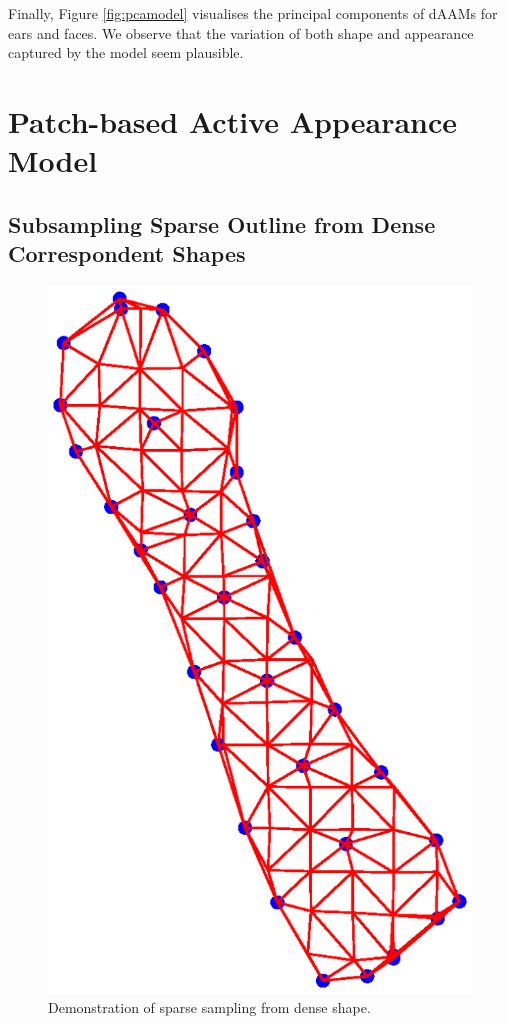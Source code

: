 Finally, Figure \ref{fig:pcamodel} visualises the principal components of dAAMs for ears and faces. We observe that the variation of both shape and appearance captured by the model seem plausible.














\section{Patch-based Active Appearance Model}
\label{sec:paam}


\subsection{Subsampling Sparse Outline from Dense Correspondent Shapes}
\label{sec:sparsesample}

\begin{figure}[!t]
\centering
\includegraphics[width=\columnwidth]{Suplementory_Meterial/dense_sample_grid}
\caption{Demonstration of sparse sampling from dense shape.}
\label{fig:sparsesample}
\end{figure}


